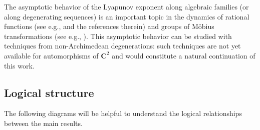 \documentclass[oneside, 12pt]{amsart}
\newcommand{\C}{\mathbf{C}}
\theoremstyle{plain}
\theoremstyle{definition}
\numberwithin{equation}{section}       %
\numberwithin{equation}{section}       %
\begin{document}
The asymptotic behavior of the Lyapunov exponent
along algebraic families (or along degenerating sequences) 
is an important topic in the dynamics of rational 
functions (see e.g., \cite{favre:2020,  luo:2022, favre-rivera:2025, favre:2025, favre-gong} and the references therein)
and  groups of Möbius transformations
(see e.g., \cite{morgan-shalen, degenerations_SL2}). This asymptotic behavior can be studied with techniques from non-Archimedean degenerations: such techniques are not yet available for automorphisms of $\C^2$ 
and would constitute a natural continuation of this work. 

\subsection{Logical structure} 
The following diagrams will be helpful to understand the logical relationships between the main results.  

\begin{small}

\smallskip

\end{small}
\end{document}
